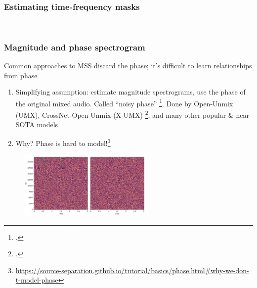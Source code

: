 \documentclass[usenames,dvipsnames]{beamer}
\begin{document}
\begin{frame}
	\frametitle{Estimating time-frequency masks}
	\begin{figure}
		\setcounter{subfigure}{0}
		\vspace{-1em}
		\centering
		\\
		\vspace{-0.5em}
		\vspace{-0.5em}
	\end{figure}
\end{frame}

\begin{frame}
	\frametitle{Magnitude and phase spectrogram}
	Common approaches to MSS discard the phase; it's difficult to learn relationships from phase
	\begin{enumerate}
		\item
			Simplifying assumption: estimate magnitude spectrograms, use the phase of the original mixed audio. Called ``noisy phase'' \footcite{noisyphase1}. Done by Open-Unmix (UMX), CrossNet-Open-Unmix (X-UMX) \footcite{umx, xumx}, and many other popular \& near-SOTA models
		\item
			Why? Phase is hard to model!\footnote{\url{https://source-separation.github.io/tutorial/basics/phase.html\#why-we-don-t-model-phase}}
	\end{enumerate}
	\begin{figure}
		\vspace{-0.5em}
	\centering
	\includegraphics[height=3.25cm]{./images-mss/whynophase.png}
	\end{figure}
\end{frame}
\end{document}
